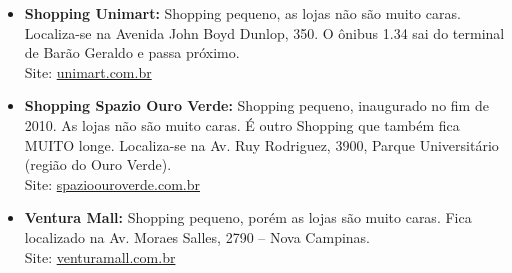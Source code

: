 \begin{itemize}
    \item   \textbf{Shopping Unimart:} Shopping pequeno, as lojas não são muito
        caras. Localiza-se na Avenida John Boyd Dunlop, 350. O ônibus 1.34 sai
        do terminal de Barão Geraldo e passa próximo.
        \\Site: \url{unimart.com.br}
    
    \item   \textbf{Shopping Spazio Ouro Verde:} Shopping pequeno, inaugurado 
        no fim de 2010. As lojas não são muito caras. É outro Shopping que 
        também fica MUITO longe. Localiza-se na Av. Ruy Rodriguez, 3900, 
        Parque Universitário (região do Ouro Verde).
        \\Site: \url{spazioouroverde.com.br}

    \item   \textbf{Ventura Mall:} Shopping pequeno, porém as lojas são muito caras.
        Fica localizado na Av. Moraes Salles, 2790 -- Nova Campinas.
        \\Site: \url{venturamall.com.br}
\end{itemize}

